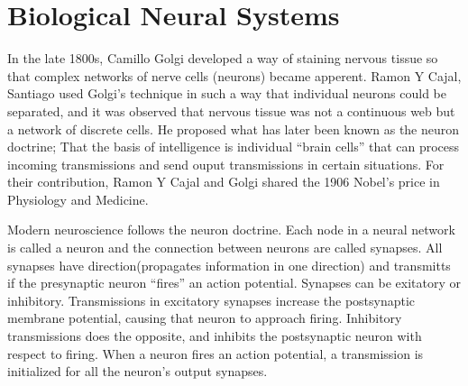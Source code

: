 
% 







\section{Biological Neural Systems}
	
	In the late 1800s, Camillo Golgi developed a way of staining nervous tissue so that complex networks of nerve cells (neurons) became apperent.
	Ramon Y Cajal, Santiago used Golgi's technique in such a way that individual neurons could be separated, and it was observed that nervous tissue was not a continuous web but a network of discrete cells. 
	He proposed what has later been known as the neuron doctrine; That the basis of intelligence is individual ``brain cells'' that can process incoming transmissions and send ouput transmissions in certain situations.
	For their contribution, Ramon Y Cajal and Golgi shared the 1906 Nobel's price in Physiology and Medicine. %

	Modern neuroscience follows the neuron doctrine. 
	Each node in a neural network is called a neuron and the connection between neurons are called synapses.
	All synapses have direction(propagates information in one direction) and transmitts if the presynaptic neuron ``fires'' an action potential.
	Synapses can be exitatory or inhibitory.
	Transmissions in excitatory synapses increase the postsynaptic membrane potential, causing that neuron to approach firing. %
	Inhibitory transmissions does the opposite, and inhibits the postsynaptic neuron with respect to firing.
	When a neuron fires an action potential, a transmission is initialized for all the neuron's output synapses.  %
	
